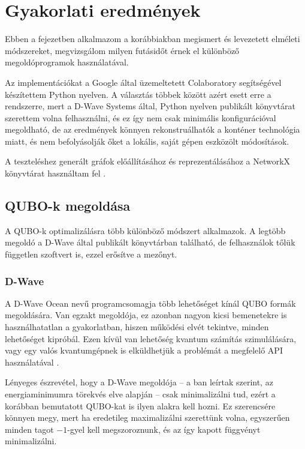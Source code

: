 
\chapter{Gyakorlati eredmények}\label{chap:practice}
Ebben a fejezetben alkalmazom a korábbiakban megismert és levezetett elméleti módszereket, megvizsgálom milyen futásidőt érnek el különböző megoldóprogramok használatával.

Az implementációkat a Google által üzemeltetett Colaboratory segítségével készítettem Python nyelven. A választás többek között azért esett erre a rendszerre, mert a D-Wave Systems által, Python nyelven publikált könyvtárat szerettem volna felhasználni, és ez így nem csak minimális konfigurációval megoldható, de az eredmények könnyen rekonstruálhatók a konténer technológia miatt, és nem befolyásolják őket a lokális, saját gépen eszközölt módosítások.

A teszteléshez generált gráfok előállításához és reprezentálásához a NetworkX könyvtárat használtam fel \cite{NetworkX}.

\section{QUBO-k megoldása}

A QUBO-k optimalizálásra több különböző módszert alkalmazok. A legtöbb megoldó a D-Wave által publikált könyvtárban található, de felhasználok tőlük független szoftvert is, ezzel erősítve a mezőnyt. 

\subsection{D-Wave}\label{sec:practiceDwave}

A D-Wave Ocean nevű programcsomagja több lehetőséget kínál QUBO formák megoldására. Van egzakt megoldója, ez azonban nagyon kicsi bemenetekre is használhatatlan a gyakorlatban, hiszen működési elvét tekintve, minden lehetőséget kipróbál. Ezen kívül van lehetőség kvantum számítás szimulálására, vagy egy valós kvantumgépnek is elküldhetjük a problémát a megfelelő API használatával \cite{DWaveOcean}.

Lényeges észrevétel, hogy a D-Wave megoldója -- a ban leírtak szerint, az energiaminimumra törekvés elve alapján -- csak minimalizálni tud, ezért a korábban bemutatott QUBO-kat is ilyen alakra kell hozni. Ez szerencsére könnyen megy, mert ha eredetileg maximalizálni szerettünk volna, egyszerűen minden tagot $-1$-gyel kell megszoroznunk, és az így kapott függvényt minimalizálni.

